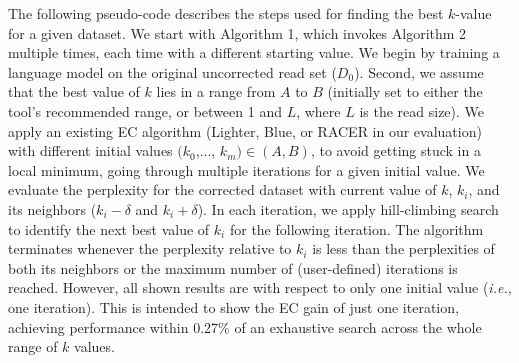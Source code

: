 The following pseudo-code describes the steps used for finding the best $k$-value for a given dataset. We start with Algorithm 1, which invokes Algorithm 2 multiple times, each time with a different starting value. We begin by training a language model on the original uncorrected read set ($D_0$). Second, we assume that the best value of $k$ lies in a range from $A$ to $B$ (initially set to either the tool's recommended range, or between 1 and $L$, where $L$ is the read size).
We apply an existing EC algorithm (Lighter, Blue, or RACER in our evaluation) with different initial values $(k_{0}$,..., $k_{m}) \in (A, B)$, to avoid getting stuck in a local minimum, going through multiple iterations for a given initial value. We evaluate the perplexity for the corrected dataset with current value of $k$, $k_i$, and its neighbors ($k_i-\delta$ and $k_i+\delta$). In each iteration, we apply hill-climbing search to identify the next best value of $k_{i}$ for the following iteration. The algorithm terminates whenever the perplexity relative to $k_i$ is less than the perplexities of both its neighbors or the maximum number of (user-defined) iterations is reached. However, all shown results are with respect to only one initial value (\textit{i.e.}, one iteration).
This is intended to show the EC gain of just one iteration, achieving performance within 0.27\% of an exhaustive search across the whole range of $k$ values. %


